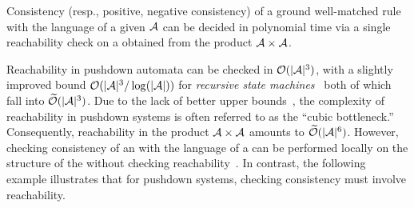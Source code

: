 \begin{proposition}
Consistency (resp.,  positive, negative consistency) of a ground well-matched rule with the language of a given \DVPA $\mathcal{A}$ can be decided in polynomial time via a single 
reachability check on a \DVPA obtained from the product $\mathcal{A} \times \mathcal{A}$. 
\end{proposition}


Reachability in pushdown automata can be checked in $\mathcal{O}(|\mathcal{A}|^3)$, with a slightly improved bound $\mathcal{O}(|\mathcal{A}|^3/\log(|\mathcal{A}|))$ for \emph{recursive state machines}~\cite{DBLP:conf/popl/Chaudhuri08}
both of which fall into $\widetilde{\mathcal{O}}(|\mathcal{A}|^3)$.
Due to the lack of better upper bounds~\cite{DBLP:conf/popl/Chaudhuri08,DBLP:conf/lics/BalasubramanianCM25}, the complexity of reachability in pushdown systems is often referred to as the ``cubic bottleneck.''
Consequently, reachability in the product $\mathcal{A} \times \mathcal{A}$ amounts to $\widetilde{\mathcal{O}}(|\mathcal{A}|^6)$. 
However, checking consistency of an \SRS with the language of a \DFA can be performed locally on the structure of the \DFA without checking reachability~\cite{ecai25}. 
In contrast, the following example illustrates that for pushdown systems, checking consistency must involve reachability.

